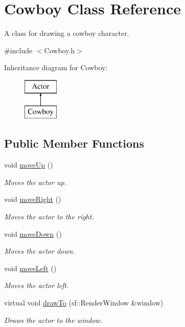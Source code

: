 \hypertarget{classCowboy}{}\section{Cowboy Class Reference}
\label{classCowboy}


A class for drawing a cowboy character.  




{\ttfamily \#include $<$Cowboy.\+h$>$}

Inheritance diagram for Cowboy\+:\begin{figure}[H]
\begin{center}
\leavevmode
\includegraphics[height=2.000000cm]{classCowboy}
\end{center}
\end{figure}
\subsection*{Public Member Functions}
\begin{DoxyCompactItemize}
\item 
void \mbox{\hyperlink{classCowboy_a3c4b0540c47492d02fa64b4740a35bcf}{move\+Up}} ()
\begin{DoxyCompactList}\small\item\em Moves the actor up. \end{DoxyCompactList}\item 
void \mbox{\hyperlink{classCowboy_a2094d31b2535a25ef8a40945473cf884}{move\+Right}} ()
\begin{DoxyCompactList}\small\item\em Moves the actor to the right. \end{DoxyCompactList}\item 
void \mbox{\hyperlink{classCowboy_a25b9c66203a4a5e762984ca0bed511e0}{move\+Down}} ()
\begin{DoxyCompactList}\small\item\em Moves the actor down. \end{DoxyCompactList}\item 
void \mbox{\hyperlink{classCowboy_a487cf6b5d1e37586e6e9b408d2aaad1a}{move\+Left}} ()
\begin{DoxyCompactList}\small\item\em Moves the actor left. \end{DoxyCompactList}\item 
virtual void \mbox{\hyperlink{classCowboy_af7e8a3e9cdcd9054b63a3661ca3f69a6}{draw\+To}} (sf\+::\+Render\+Window \&window)
\begin{DoxyCompactList}\small\item\em Draws the actor to the window. \end{DoxyCompactList}\end{DoxyCompactItemize}
